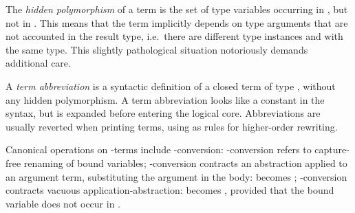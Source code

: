 \begin{isabellebody}
\begin{isamarkuptext}
  \medskip The \emph{hidden polymorphism} of a term 
  is the set of type variables occurring in , but not in
  \isa{{\isasymsigma}}.  This means that the term implicitly depends on type
  arguments that are not accounted in the result type, i.e.\ there are
  different type instances  and  with the same type.  This slightly
  pathological situation notoriously demands additional care.

  \medskip A \emph{term abbreviation} is a syntactic definition  of a closed term  of type \isa{{\isasymsigma}},
  without any hidden polymorphism.  A term abbreviation looks like a
  constant in the syntax, but is expanded before entering the logical
  core.  Abbreviations are usually reverted when printing terms, using
   as rules for higher-order rewriting.

  \medskip Canonical operations on \isa{{\isasymlambda}}-terms include \isa{{\isasymalpha}{\isasymbeta}{\isasymeta}}-conversion: \isa{{\isasymalpha}}-conversion refers to capture-free
  renaming of bound variables; \isa{{\isasymbeta}}-conversion contracts an
  abstraction applied to an argument term, substituting the argument
  in the body:  becomes ; \isa{{\isasymeta}}-conversion contracts vacuous application-abstraction:  becomes , provided that the bound variable
  does not occur in .


\end{isamarkuptext}
\end{isabellebody}
